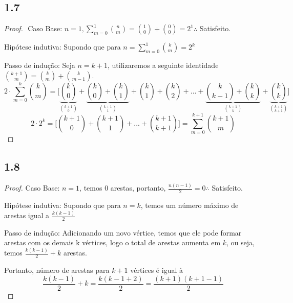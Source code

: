 \documentclass{article}
\begin{document}
\subsection*{1.7}
\begin{proof}
$ $\newline
Caso Base: $n = 1,\sum^1_{m=0}{n\choose m}={1\choose 0}+{0\choose 0}=2^1 \therefore$ Satisfeito.

Hipótese indutiva: Supondo que para $n=\sum^1_{m=0}{k\choose m}=2^k$

Passo de indução: Seja $n = k + 1$, utilizaremos a seguinte identidade ${k+1\choose m} = {k\choose m}+{k \choose m-1}$.
$$2\cdot \sum^k_{m=0}{k\choose m} = \bigg[\underbrace{{k\choose 0}}_{k+1\choose0}  + \underbrace{{k\choose 0}+{k\choose 1}}_{k+1\choose 1}
+{k\choose 1}+{k \choose 2}+...+
\underbrace{{k\choose k-1}+{k\choose k}}_{k+1\choose k}+\underbrace{{k\choose k}}_{k+1\choose k+1}\bigg]$$
$$2\cdot 2^k = \bigg[{k+1\choose0}+{k+1\choose1}+...+{k+1\choose k+1}\bigg] = \sum^{k+1}_{m=0}{k+1\choose m}$$

\end{proof}

\subsection*{1.8}
\begin{proof}
Caso Base: $n = 1$, temos 0 arestas, portanto, $\frac{n(n-1)}{2} = 0 \therefore$ Satisfeito.

Hipótese indutiva: Supondo que para $n=k$, temos um número máximo de arestas igual a $\frac{k(k-1)}{2}$

Passo de indução: Adicionando um novo vértice, temos que ele pode formar arestas com os demais k
vértices, logo o total de arestas aumenta em $k$, ou seja, temos $\frac{k(k-1)}{2}+k$ arestas.

Portanto, número de arestas para $k+1$ vértices é igual à 
$$\frac{k(k-1)}{2}+k = \frac{k(k-1 + 2)}{2} = \frac{(k+1)(k+1 -1)}{2}$$

\end{proof}
\end{document}
